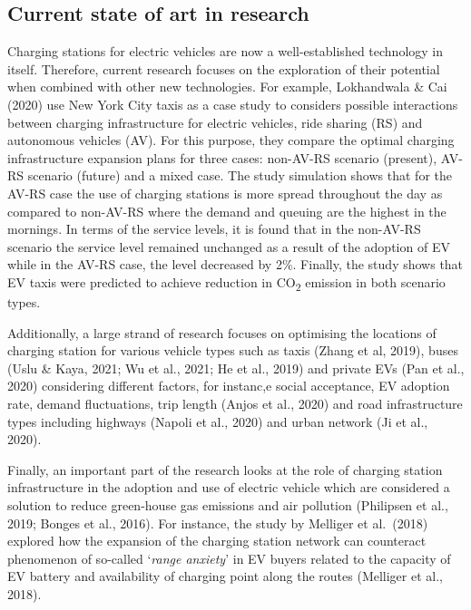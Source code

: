 \documentclass[
]{book}
\begin{document}
\hypertarget{current-state-of-art-in-research-5}{%
\subsection*{Current state of art in research}\label{current-state-of-art-in-research-5}}

Charging stations for electric vehicles are now a well-established technology in itself. Therefore, current research focuses on the exploration of their potential when combined with other new technologies. For example, Lokhandwala \& Cai (2020) use New York City taxis as a case study to considers possible interactions between charging infrastructure for electric vehicles, ride sharing (RS) and autonomous vehicles (AV). For this purpose, they compare the optimal charging infrastructure expansion plans for three cases: non-AV-RS scenario (present), AV-RS scenario (future) and a mixed case. The study simulation shows that for the AV-RS case the use of charging stations is more spread throughout the day as compared to non-AV-RS where the demand and queuing are the highest in the mornings. In terms of the service levels, it is found that in the non-AV-RS scenario the service level remained unchanged as a result of the adoption of EV while in the AV-RS case, the level decreased by 2\%. Finally, the study shows that EV taxis were predicted to achieve reduction in CO\textsubscript{2} emission in both scenario types.

Additionally, a large strand of research focuses on optimising the locations of charging station for various vehicle types such as taxis (Zhang et al, 2019), buses (Uslu \& Kaya, 2021; Wu et al., 2021; He et al., 2019) and private EVs (Pan et al., 2020) considering different factors, for instanc,e social acceptance, EV adoption rate, demand fluctuations, trip length (Anjos et al., 2020) and road infrastructure types including highways (Napoli et al., 2020) and urban network (Ji et al., 2020).

Finally, an important part of the research looks at the role of charging station infrastructure in the adoption and use of electric vehicle which are considered a solution to reduce green-house gas emissions and air pollution (Philipsen et al., 2019; Bonges et al., 2016). For instance, the study by Melliger et al.~(2018) explored how the expansion of the charging station network can counteract phenomenon of so-called `\emph{range anxiety}' in EV buyers related to the capacity of EV battery and availability of charging point along the routes (Melliger et al., 2018).
\end{document}
